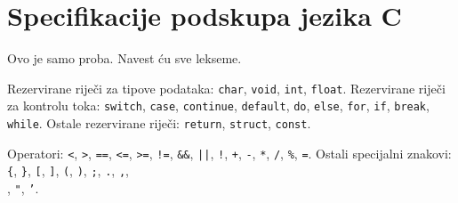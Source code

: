 \section{Specifikacije podskupa jezika C}

Ovo je samo proba. Navest ću sve lekseme.

Rezervirane riječi za tipove podataka:  \texttt{char}, \texttt{void}, 
\texttt{int}, \texttt{float}.
Rezervirane riječi za kontrolu toka: \texttt{switch}, \texttt{case}, 
 \texttt{continue},  \texttt{default}, \texttt{do}, \texttt{else}, \texttt{for}, 
 \texttt{if}, \texttt{break},  \texttt{while}.
Ostale rezervirane riječi: \texttt{return},  \texttt{struct}, \texttt{const}.

Operatori: \texttt{<},  \texttt{>},  \texttt{==},  \texttt{<=},  \texttt{>=},  \texttt{!=}, 
 \texttt{\&\&},  \texttt{||},  \texttt{!},  \texttt{+},  \texttt{-},  \texttt{*}, 
 \texttt{/},  \texttt{\%},  \texttt{=}.
Ostali specijalni znakovi:  \texttt{\{},  \texttt{\}},  \texttt{[},  \texttt{]},  
 \texttt{(},  \texttt{)}, \texttt{;},  \texttt{.},  \texttt{,},  \texttt{\\},
 \texttt{"},  \texttt{'}.

